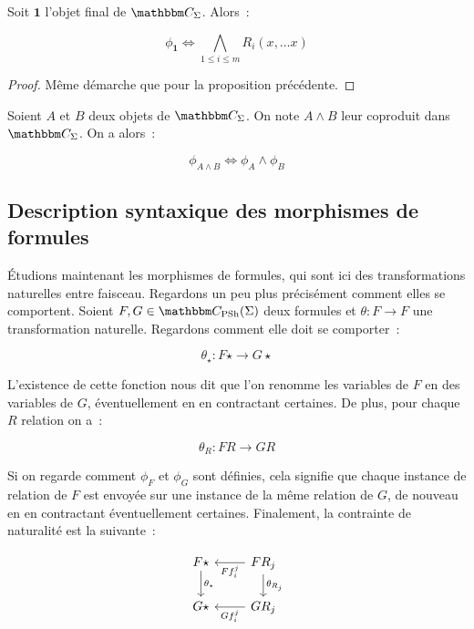 \begin{lem}
    Soit $\mathbf{1}$ l'objet final de $\C_\Sigma$. Alors~:

    \[\phi_\mathbf{1} \iff \bigwedge_{1\leq i\leq m}R_i(x,\dots x)\]
\end{lem}

\begin{proof}
    Même démarche que pour la proposition précédente.
\end{proof}

\begin{lem}
    Soient $A$ et $B$ deux objets de $\C_\Sigma$. On note $A\wedge B$ leur coproduit
    dans $\C_\Sigma$. On a alors~:

    \[\phi_{A\wedge B} \iff \phi_A\wedge\phi_B \]
\end{lem}

\subsection{Description syntaxique des morphismes de formules}

Étudions maintenant les morphismes de formules, qui sont ici des transformations
naturelles entre faisceau. Regardons un peu plus précisément comment elles se
comportent. Soient $F,G\in\C_\psh(\Sigma)$ deux formules et $\theta:F\rightarrow F$
une transformation naturelle. Regardons comment elle doit se comporter~:

\[ \theta_\star : F\star \rightarrow G\star \]

L'existence de cette fonction nous dit que l'on renomme les variables de $F$ en des
variables de $G$, éventuellement en en contractant certaines. De plus, pour chaque
$R$ relation on a~:

\[ \theta_R : FR\rightarrow GR\]

Si on regarde comment $\phi_F$ et $\phi_G$ sont définies, cela signifie que chaque
instance de relation de $F$ est envoyée sur une instance de la même relation de $G$,
de nouveau en en contractant éventuellement certaines. Finalement, la contrainte
de naturalité est la suivante~:

\[\begin{tikzcd}
    F\star \arrow[d, "\theta_\star"] & FR_j \arrow[l, "Ff_i^j"]
                                            \arrow[d, "\theta_{R_j}"] \\
    G\star & GR_j \arrow[l, "Gf_i^j"] \\
\end{tikzcd}\]

